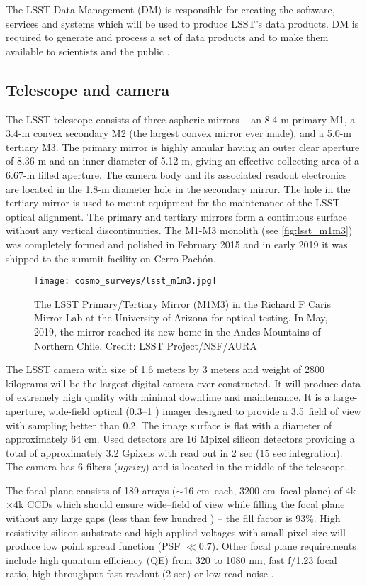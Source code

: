The LSST Data Management (DM) is responsible for creating the software, services and systems which will be used to produce LSST's data products. DM is required to generate and process a set of data products and to make them available to scientists and the public \parencite{LSST_DM}.

\subsection{Telescope and camera}
The LSST telescope consists of three aspheric mirrors -- an 8.4-m primary M1, a 3.4-m convex secondary M2 (the largest convex mirror ever made), and a 5.0-m tertiary M3. The primary mirror is highly annular having an outer clear aperture of 8.36 m and an inner diameter of 5.12 m, giving an effective collecting area of a 6.67-m filled aperture. The camera body and its associated readout electronics are located in the 1.8-m diameter hole in the secondary mirror.  The hole in the tertiary mirror is used to mount equipment for the maintenance of the LSST optical alignment. The primary and tertiary mirrors form a continuous surface without any vertical discontinuities. The M1-M3 monolith (see \autoref{fig:lsst_m1m3}) was completely formed and polished in February 2015 and in early 2019 it was shipped to the summit facility on Cerro Pach\'{o}n.
\begin{figure}[htb]
    \centering
    \texttt{[image: cosmo\_surveys/lsst\_m1m3.jpg]}
    \caption{The LSST Primary/Tertiary Mirror (M1M3) in the Richard F Caris Mirror Lab at the University of Arizona for optical testing. In May, 2019, the mirror reached its new home in the Andes Mountains of Northern Chile. Credit: LSST Project/NSF/AURA}
    \label{fig:lsst_m1m3}
\end{figure}

The LSST camera with size of 1.6 meters by 3 meters and weight of 2800 kilograms will be the largest digital camera ever constructed. It will produce data of extremely high quality with minimal downtime and maintenance. It is a large-aperture, wide-field optical (0.3--1 \um) imager designed to provide a 3.5\textdegree\ field of view with sampling better than 0.2\arcsec. The image surface is flat with a diameter of approximately 64 cm. Used detectors are 16 Mpixel silicon detectors providing a total of approximately 3.2 Gpixels with read out in 2 sec (15 sec integration). The camera has 6 filters ($ugrizy$) and is located in the middle of the telescope.

The focal plane consists of 189 arrays ($\sim$16 cm\sq\ each, 3200 cm\sq\ focal plane) of 4k$\times$4k CCDs which should ensure wide--field of view while filling the focal plane without any large gaps (less than few hundred \um) -- the fill factor is 93\%. High resistivity silicon substrate and high applied voltages with small pixel size will produce low point spread function (PSF $\ll0.7$\arcsec). Other focal plane requirements include high quantum efficiency (QE) from 320 to 1080 nm, fast f/1.23 focal ratio, high throughput fast readout (2 sec) or low read noise \parencite{2017JInst..12C3017A}.


